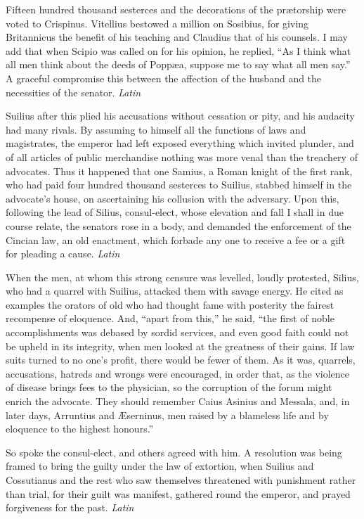 Fifteen hundred thousand sesterces and the decorations of the prætorship were voted to Crispinus. Vitellius bestowed a million on Sosibius, for giving Britannicus the benefit of his teaching and Claudius that of his counsels. I may add that when Scipio was called on for his opinion, he replied, ``As I think what all men think about the deeds of Poppæa, suppose me to say what all men say.'' A graceful compromise this between the affection of the husband and the necessities of the senator. \emph{Latin}


Suilius after this plied his accusations without cessation or pity, and his audacity had many rivals. By assuming to himself all the functions of laws and magistrates, the emperor had left exposed everything which invited plunder, and of all articles of public merchandise nothing was more venal than the treachery of advocates. Thus it happened that one Samius, a Roman knight of the first rank, who had paid four hundred thousand sesterces to Suilius, stabbed himself in the advocate's house, on ascertaining his collusion with the adversary. Upon this, following the lead of Silius, consul-elect, whose elevation and fall I shall in due course relate, the senators rose in a body, and demanded the enforcement of the Cincian law, an old enactment, which forbade any one to receive a fee or a gift for pleading a cause. \emph{Latin}


When the men, at whom this strong censure was levelled, loudly protested, Silius, who had a quarrel with Suilius, attacked them with savage energy. He cited as examples the orators of old who had thought fame with posterity the fairest recompense of eloquence. And, ``apart from this,'' he said, ``the first of noble accomplishments was debased by sordid services, and even good faith could not be upheld in its integrity, when men looked at the greatness of their gains. If law suits turned to no one's profit, there would be fewer of them. As it was, quarrels, accusations, hatreds and wrongs were encouraged, in order that, as the violence of disease brings fees to the physician, so the corruption of the forum might enrich the advocate. They should remember Caius Asinius and Messala, and, in later days, Arruntius and Æserninus, men raised by a blameless life and by eloquence to the highest honours.''

So spoke the consul-elect, and others agreed with him. A resolution was being framed to bring the guilty under the law of extortion, when Suilius and Cossutianus and the rest who saw themselves threatened with punishment rather than trial, for their guilt was manifest, gathered round the emperor, and prayed forgiveness for the past. \emph{Latin}

